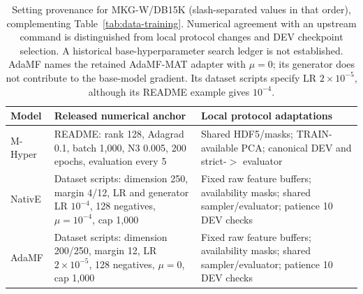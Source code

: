 \begin{table}[htbp]
\centering\footnotesize
\caption{Setting provenance for MKG-W/DB15K (slash-separated values in that order), complementing Table~\ref{tab:data-training}. Numerical agreement with an upstream command is distinguished from local protocol changes and DEV checkpoint selection. A historical base-hyperparameter search ledger is not established. AdaMF names the retained AdaMF-MAT adapter with $\mu=0$; its generator does not contribute to the base-model gradient. Its dataset scripts specify LR $2\times10^{-5}$, although its README example gives $10^{-4}$.}
\label{tab:training-origins}
\begin{tabular}{p{.13\linewidth}p{.40\linewidth}p{.37\linewidth}}
\toprule
Model & Released numerical anchor & Local protocol adaptations\\
\midrule
M-Hyper & README: rank 128, Adagrad 0.1, batch 1,000, N3 0.005, 200 epochs, evaluation every 5 & Shared HDF5/masks; TRAIN-available PCA; canonical DEV and strict-$>$ evaluator\\
NativE & Dataset scripts: dimension 250, margin 4/12, LR and generator LR $10^{-4}$, 128 negatives, $\mu=10^{-4}$, cap 1,000 & Fixed raw feature buffers; availability masks; shared sampler/evaluator; patience 10 DEV checks\\
AdaMF & Dataset scripts: dimension 200/250, margin 12, LR $2\!\times\!10^{-5}$, 128 negatives, $\mu=0$, cap 1,000 & Fixed raw feature buffers; availability masks; shared sampler/evaluator; patience 10 DEV checks\\
\bottomrule
\end{tabular}
\end{table}
